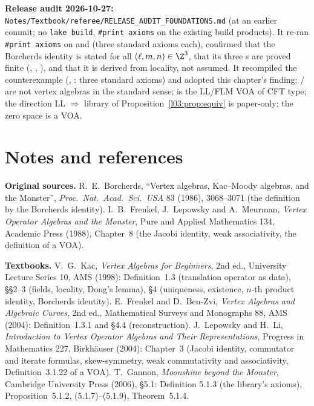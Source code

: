 \textbf{Release audit 2026-10-27:} \texttt{Notes/\allowbreak Textbook/\allowbreak referee/\allowbreak RELEASE\_AUDIT\_FOUNDATIONS.md}
(at an earlier commit; no \texttt{lake build}, \texttt{\#print axioms} on the existing build products). It re-ran
\texttt{\#print axioms} on  and  (three
standard axioms each), confirmed that the Borcherds identity is stated for all $(\ell,m,n)\in\Z^3$, that its three
s are proved finite (, , ), and that it is derived from locality,
not assumed. It recompiled the counterexample  (, :
three standard axioms) and adopted this chapter's finding: / are not vertex
algebras in the standard sense;  is the LL/FLM VOA of CFT type; the direction
LL $\Rightarrow$ library of Proposition~\ref{l03:prop:equiv} is paper-only; the zero space is a VOA.

\section{Notes and references}\label{l03:sec:notes}

\textbf{Original sources.} R.~E.~Borcherds, ``Vertex algebras, Kac--Moody algebras, and the Monster'',
\emph{Proc.\ Nat.\ Acad.\ Sci.\ USA} 83 (1986), 3068--3071 (the definition by the Borcherds identity).
I.~B.~Frenkel, J.~Lepowsky and A.~Meurman, \emph{Vertex Operator Algebras and the Monster}, Pure and
Applied Mathematics 134, Academic Press (1988), Chapter~8 (the Jacobi identity, weak associativity,
the definition of a VOA).

\textbf{Textbooks.} V.~G.~Kac, \emph{Vertex Algebras for Beginners}, 2nd ed., University Lecture
Series 10, AMS (1998): Definition~1.3 (translation operator as data), §§2--3 (fields, locality,
Dong's lemma), §4 (uniqueness, existence, $n$-th product identity, Borcherds identity).
E.~Frenkel and D.~Ben-Zvi, \emph{Vertex Algebras and Algebraic Curves}, 2nd ed., Mathematical
Surveys and Monographs 88, AMS (2004): Definition~1.3.1 and §4.4 (reconstruction).
J.~Lepowsky and H.~Li, \emph{Introduction to Vertex Operator Algebras and Their Representations},
Progress in Mathematics 227, Birkh\"auser (2004): Chapter~3 (Jacobi identity, commutator and iterate
formulas, skew-symmetry, weak commutativity and associativity, Definition~3.1.22 of a VOA).
T.~Gannon, \emph{Moonshine beyond the Monster}, Cambridge University Press (2006), §5.1: Definition
5.1.3 (the library's axioms), Proposition~5.1.2, (5.1.7)--(5.1.9), Theorem~5.1.4.

